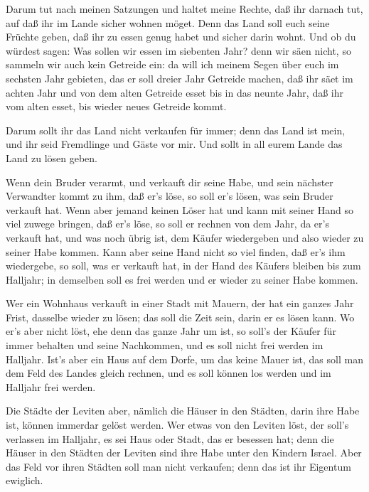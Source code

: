  Darum tut nach meinen Satzungen und haltet meine Rechte,
daß ihr darnach tut, auf daß ihr im Lande sicher wohnen möget.
 Denn das Land soll euch seine Früchte geben, daß ihr zu
essen genug habet und sicher darin wohnt.  Und ob du
würdest sagen: Was sollen wir essen im siebenten Jahr? denn wir säen
nicht, so sammeln wir auch kein Getreide ein:  da will ich
meinem Segen über euch im sechsten Jahr gebieten, das er soll dreier
Jahr Getreide machen,  daß ihr säet im achten Jahr und von
dem alten Getreide esset bis in das neunte Jahr, daß ihr vom alten
esset, bis wieder neues Getreide kommt.

 Darum sollt ihr das Land nicht verkaufen für immer; denn
das Land ist mein, und ihr seid Fremdlinge und Gäste vor mir.
 Und sollt in all eurem Lande das Land zu lösen geben.

 Wenn dein Bruder verarmt, und verkauft dir seine Habe, und
sein nächster Verwandter kommt zu ihm, daß er's löse, so soll er's
lösen, was sein Bruder verkauft hat.  Wenn aber jemand
keinen Löser hat und kann mit seiner Hand so viel zuwege bringen, daß
er's löse,  so soll er rechnen von dem Jahr, da er's
verkauft hat, und was noch übrig ist, dem Käufer wiedergeben und also
wieder zu seiner Habe kommen.  Kann aber seine Hand nicht
so viel finden, daß er's ihm wiedergebe, so soll, was er verkauft hat,
in der Hand des Käufers bleiben bis zum Halljahr; in demselben soll es
frei werden und er wieder zu seiner Habe kommen.

 Wer ein Wohnhaus verkauft in einer Stadt mit Mauern, der
hat ein ganzes Jahr Frist, dasselbe wieder zu lösen; das soll die Zeit
sein, darin er es lösen kann.  Wo er's aber nicht löst, ehe
denn das ganze Jahr um ist, so soll's der Käufer für immer behalten und
seine Nachkommen, und es soll nicht frei werden im Halljahr.
 Ist's aber ein Haus auf dem Dorfe, um das keine Mauer ist,
das soll man dem Feld des Landes gleich rechnen, und es soll können los
werden und im Halljahr frei werden.

 Die Städte der Leviten aber, nämlich die Häuser in den
Städten, darin ihre Habe ist, können immerdar gelöst werden.
 Wer etwas von den Leviten löst, der soll's verlassen im
Halljahr, es sei Haus oder Stadt, das er besessen hat; denn die Häuser
in den Städten der Leviten sind ihre Habe unter den Kindern Israel.
 Aber das Feld vor ihren Städten soll man nicht verkaufen;
denn das ist ihr Eigentum ewiglich.

